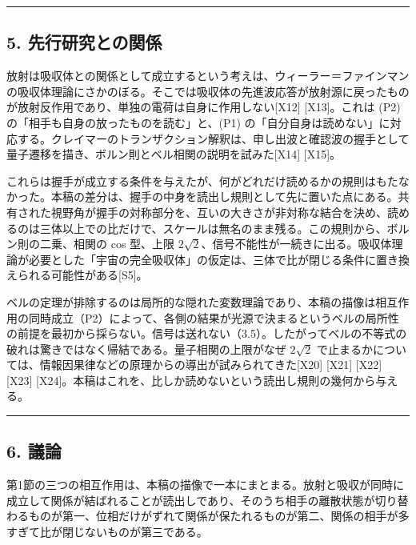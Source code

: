 \documentclass[
  a4paper,
]{ltjsarticle}
\begin{document}
\begin{center}\rule{0.5\linewidth}{0.5pt}\end{center}

\subsection{5.
先行研究との関係}\label{ux5148ux884cux7814ux7a76ux3068ux306eux95a2ux4fc2}

放射は吸収体との関係として成立するという考えは、ウィーラー＝ファインマンの吸収体理論にさかのぼる。そこでは吸収体の先進波応答が放射源に戻ったものが放射反作用であり、単独の電荷は自身に作用しない{[}X12{]}
{[}X13{]}。これは (P2) の「相手も自身の放ったものを読む」と、(P1)
の「自分自身は読めない」に対応する。クレイマーのトランザクション解釈は、申し出波と確認波の握手として量子遷移を描き、ボルン則とベル相関の説明を試みた{[}X14{]}
{[}X15{]}。

これらは握手が成立する条件を与えたが、何がどれだけ読めるかの規則はもたなかった。本稿の差分は、握手の中身を読出し規則として先に置いた点にある。共有された視野角が握手の対称部分を、互いの大きさが非対称な結合を決め、読めるのは三体以上での比だけで、スケールは無名のまま残る。この規則から、ボルン則の二乗、相関の
cos 型、上限
\(2\sqrt{2}\)、信号不能性が一続きに出る。吸収体理論が必要とした「宇宙の完全吸収体」の仮定は、三体で比が閉じる条件に置き換えられる可能性がある{[}S5{]}。

ベルの定理が排除するのは局所的な隠れた変数理論であり、本稿の描像は相互作用の同時成立（P2）によって、各側の結果が光源で決まるというベルの局所性の前提を最初から採らない。信号は送れない（3.5）。したがってベルの不等式の破れは驚きではなく帰結である。量子相関の上限がなぜ
\(2\sqrt{2}\)
で止まるかについては、情報因果律などの原理からの導出が試みられてきた{[}X20{]}
{[}X21{]} {[}X22{]} {[}X23{]}
{[}X24{]}。本稿はこれを、比しか読めないという読出し規則の幾何から与える。

\begin{center}\rule{0.5\linewidth}{0.5pt}\end{center}

\subsection{6. 議論}\label{ux8b70ux8ad6}

第1節の三つの相互作用は、本稿の描像で一本にまとまる。放射と吸収が同時に成立して関係が結ばれることが読出しであり、そのうち相手の離散状態が切り替わるものが第一、位相だけがずれて関係が保たれるものが第二、関係の相手が多すぎて比が閉じないものが第三である。
\end{document}
